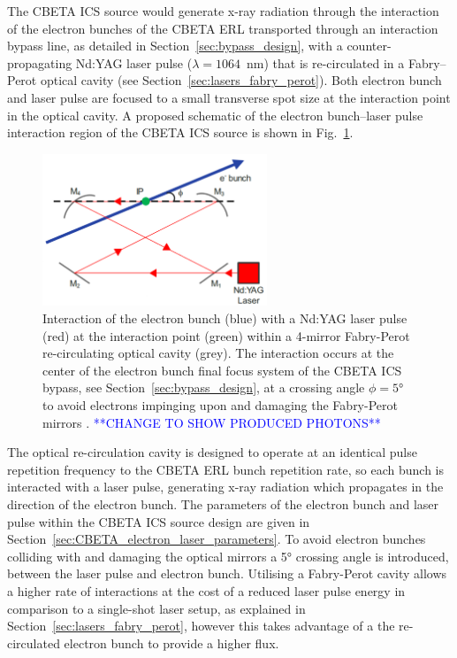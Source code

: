 \documentclass[../main.tex]{subfiles}
\begin{document}
The CBETA ICS source would generate x-ray radiation through the interaction of the electron bunches of the CBETA ERL transported through an interaction bypass line, as detailed in Section~\ref{sec:bypass_design}, with a counter-propagating Nd:YAG laser pulse ($\lambda=1064$~\si{\nano\meter}) that is re-circulated in a Fabry--Perot optical cavity (see Section~\ref{sec:lasers_fabry_perot}). Both electron bunch and laser pulse are focused to a small transverse spot size at the interaction point in the optical cavity. A proposed schematic of the electron bunch--laser pulse interaction region of the CBETA ICS source is shown in Fig.~\ref{fig:CBETA_ICS_Interaction}. 
\begin{figure}[!h]
\centering
\includegraphics[width=0.6\textwidth]{Figures/CBETA_Inverse_Compton_Source_Design/CBETA_ICS_Interaction_fixed.pdf}
\caption{Interaction of the electron bunch (blue) with a Nd:YAG laser pulse (red) at the interaction point (green) within a 4-mirror Fabry-Perot re-circulating optical cavity (grey). The interaction occurs at the center of the electron bunch final focus system of the CBETA ICS bypass, see Section~\ref{sec:bypass_design}, at a crossing angle $\phi=5$\si{\degree} to avoid electrons impinging upon and damaging the Fabry-Perot mirrors \cite{variola2011luminosity}. \textcolor{blue}{**CHANGE TO SHOW PRODUCED PHOTONS**}}
\label{fig:CBETA_ICS_Interaction}
\end{figure}
The optical re-circulation cavity is designed to operate at an identical pulse repetition frequency to the CBETA ERL bunch repetition rate, so each bunch is interacted with a laser pulse, generating x-ray radiation which propagates in the direction of the electron bunch. The parameters of the electron bunch and laser pulse within the CBETA ICS source design are given in Section~\ref{sec:CBETA_electron_laser_parameters}. To avoid electron bunches colliding with and damaging the optical mirrors \cite{variola2011luminosity} a 5\si{\degree} crossing angle is introduced, between the laser pulse and electron bunch. Utilising a Fabry-Perot cavity allows a higher rate of interactions at the cost of a reduced laser pulse energy in comparison to a single-shot laser setup, as explained in Section~\ref{sec:lasers_fabry_perot}, however this takes advantage of a the re-circulated electron bunch to provide a higher flux.
\end{document}
